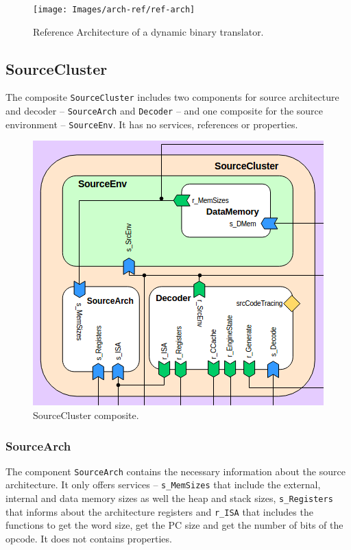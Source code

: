 \documentclass{report}
\begin{document}
		\begin{figure} [H]
			\centering
			\texttt{[image: Images/arch-ref/ref-arch]}
			\caption{Reference Architecture of a dynamic binary translator.}
			\label{fig:ref-arch}
		\end{figure}	
	
		\subsection{SourceCluster}
		
		\par The composite \texttt{SourceCluster} includes two components for source architecture and decoder -- \texttt{SourceArch} and \texttt{Decoder} -- and one composite for the source environment -- \texttt{SourceEnv}. It has no services, references or properties.
		
		\begin{figure} [H]
			\centering
			\includegraphics[width=0.6\linewidth]{Images/arch-ref/SourceCluster}
			\caption{SourceCluster composite.}
			\label{fig:SourceCluster}
		\end{figure}
		
			\subsubsection{SourceArch}
			
			The component \texttt{SourceArch} contains the necessary information about the source architecture. It only offers services -- \texttt{s\_MemSizes} that include the external, internal and data memory sizes as well the heap and stack sizes, \texttt{s\_Registers} that informs about the architecture registers and \texttt{r\_ISA} that includes the functions to get the word size, get the PC size and get the number of bits of the opcode. It does not contains properties.
			
\end{document}
